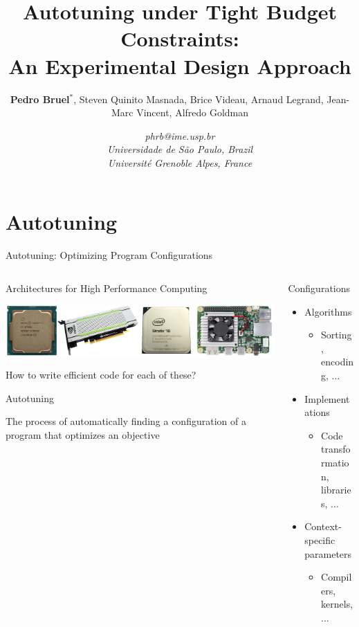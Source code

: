 \documentclass[10pt, compress, aspectratio=169, xcolor={table,usenames,dvipsnames}]{beamer}
\author{ \footnotesize \textbf{\alert{Pedro Bruel$^{*}$}},  Steven Quinito Masnada, Brice Videau, Arnaud Legrand, Jean-Marc Vincent, Alfredo Goldman}
\date{ \scriptsize \textit{phrb@ime.usp.br} \\[1em] \textit{Universidade de São Paulo, Brazil} \\ \textit{Université Grenoble Alpes, France}}
\title{Autotuning under Tight Budget Constraints:  \\ An Experimental Design Approach}
\begin{document}
\maketitle

\section{Autotuning}
\label{sec:org43a8f42}
\begin{frame}[label={sec:orgb80100e}]{Autotuning: Optimizing Program Configurations}
\begin{columns}
\begin{column}{0.5\columnwidth}
\begin{block}{Architectures for High Performance Computing}
\begin{center}
\includegraphics[width=\columnwidth]{../../../img/architectures_2.png}
\end{center}

How to write \alert{efficient code} for each of these?

\begin{block}{Autotuning}
\vspace{.2cm}

The process of automatically finding a \mbox{\alert{configuration}} of a program
that optimizes an \mbox{\alert{objective}}
\end{block}
\end{block}
\end{column}

\begin{column}{0.5\columnwidth}
\begin{block}{Configurations}
\begin{itemize}
\item Algorithms
\begin{itemize}
\item Sorting, encoding, \(\dots\)
\end{itemize}
\item Implementations
\begin{itemize}
\item Code transformation, libraries, \(\dots\)
\end{itemize}
\item Context-specific parameters
\begin{itemize}
\item Compilers, kernels, \(\dots\)
\end{itemize}
\end{itemize}


\end{block}
\end{column}
\end{columns}
\end{frame}
\end{document}
